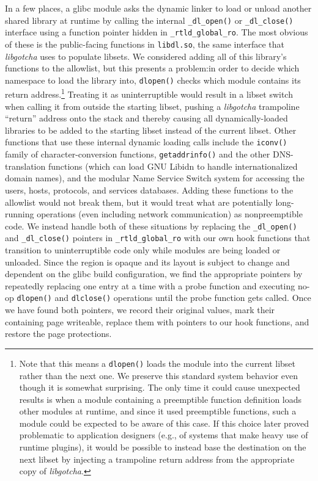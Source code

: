 In a few places, a glibc module asks the dynamic linker to load or unload another
shared library at runtime by calling the internal \texttt{\_dl\_open()} or
\texttt{\_dl\_close()} interface using a function pointer hidden in
\texttt{\_rtld\_global\_ro}.  The most obvious of these is the public-facing
functions in \texttt{libdl.so}, the same interface that \textit{libgotcha} uses to
populate libsets.  We considered adding all of this library's functions to the
allowlist, but this presents a problem:\@ in order to decide which namespace to load
the library into, \texttt{dlopen()} checks which module contains its return
address.\footnote{Note that this means a \texttt{dlopen()} loads the module into the
current libset rather than the next one.  We preserve this standard system behavior
even though it is somewhat surprising.  The only time it could cause unexpected
results is when a module containing a preemptible function definition loads other
modules at runtime, and since it used preemptible functions, such a module could be
expected to be aware of this case.  If this choice later proved problematic to
application designers (e.g., of systems that make heavy use of runtime plugins), it
would be possible to instead base the destination on the next libset by injecting a
trampoline return address from the appropriate copy of \textit{libgotcha}.}
Treating it as uninterruptible would result in a libset switch when calling it from
outside the starting libset, pushing a \textit{libgotcha} trampoline ``return''
address onto the stack and thereby causing all dynamically-loaded libraries to be
added to the starting libset instead of the current libset.  Other functions that
use these internal dynamic loading calls include the \texttt{iconv()} family of
character-conversion functions, \texttt{getaddrinfo()} and the other DNS-translation
functions (which can load GNU Libidn to handle internationalized domain names), and
the modular Name Service Switch system for accessing the users, hosts, protocols,
and services databases.  Adding these functions to the allowlist would not break
them, but it would treat what are potentially long-running operations (even including
network communication) as nonpreemptible code.  We instead handle both of these
situations by
replacing the \texttt{\_dl\_open()} and \texttt{\_dl\_close()} pointers in
\texttt{\_rtld\_global\_ro} with our own hook functions that transition to
uninterruptible code only while modules are being loaded or unloaded.  Since the
region is opaque and its layout is subject to change and dependent on the glibc build
configuration, we find the appropriate
pointers by repeatedly replacing one entry at a time with a probe function and
executing no-op
\texttt{dlopen()} and \texttt{dlclose()} operations until the probe function gets
called.  Once we have found both pointers, we record their original values, mark
their containing page writeable, replace them with pointers to our hook functions,
and restore the page protections.
\\


